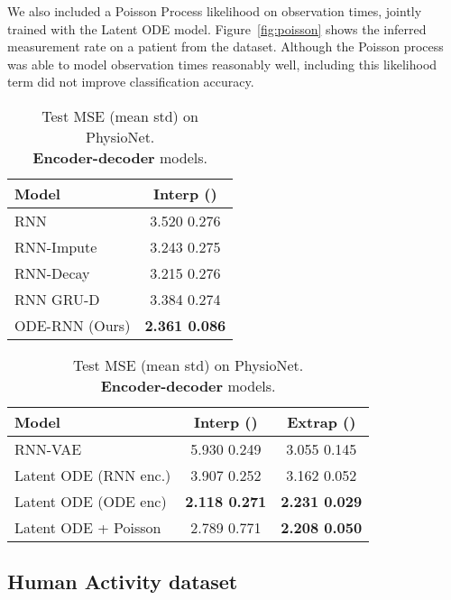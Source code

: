 \documentclass{article}
\begin{document}
We also included a Poisson Process likelihood on observation times, jointly trained with the Latent ODE model.
Figure~\ref{fig:poisson} shows the inferred measurement rate on a patient from the dataset.
Although the Poisson process was able to model observation times reasonably well, including this likelihood term did not improve classification accuracy.


\begin{table}
\parbox{0.36\linewidth}{
        \centering
        \captionsetup{justification=centering}
        \caption{Test MSE (mean  std) on PhysioNet. \textbf{Autoregressive} models.}
    	\label{tab:phys_autoreg}
        \begin{tabular}{@{}lc@{}}
        \toprule
         Model & {\small Interp ()}\\
        \midrule
        RNN  &   3.520  0.276 \\
        RNN-Impute & 3.243  0.275 \\
        RNN-Decay &  3.215  0.276 \\
        RNN GRU-D & 3.384  0.274 \\
        \addlinespace[2pt]
        \hdashline
        \addlinespace[2pt]
        ODE-RNN (Ours) & \textbf{2.361  0.086} \\
        \bottomrule
        \end{tabular}
    }
    \hfill
    \parbox{0.6\linewidth}{ 
        \centering
        \captionsetup{justification=centering}
        \caption{Test MSE (mean  std) on PhysioNet.\\\textbf{Encoder-decoder} models.}
    	\label{tab:phys_autoencoder}
        \begin{tabular}{@{}lcc@{}}
        \toprule
        Model & {\small Interp ()} & {\small Extrap ()}\\
        \midrule
        RNN-VAE & 5.930  0.249 & 3.055  0.145 \\
        Latent ODE (RNN enc.) & 3.907  0.252 & 3.162  0.052\\
        \addlinespace[2pt]
        \hdashline
        \addlinespace[2pt]
        Latent ODE (ODE enc) & \textbf{2.118  0.271} & \textbf{2.231  0.029} \\
        Latent ODE + Poisson & 2.789  0.771 & \textbf{2.208  0.050}\\
        \bottomrule
        \end{tabular}
    }
\end{table}


\subsection{Human Activity dataset}
\end{document}

